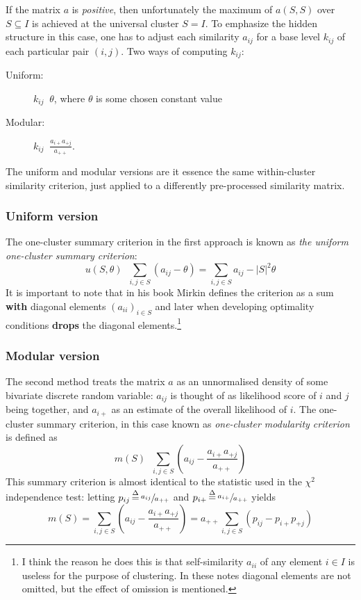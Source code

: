 \documentclass[a4paper]{article}
\newcommand{\brac}[1]{{\left ( #1 \right )}}
\newcommand{\abs}[1]{{\left | #1 \right |}}
\newcommand{\defn}{\mathop{\overset{\Delta}{=}}\nolimits}
\begin{document}
If the matrix $a$ is \emph{positive}, then unfortunately the maximum of $a(S,S)$ over $S\subseteq I$ is achieved at the universal cluster $S=I$. To emphasize the hidden structure in this case, one has to adjust each similarity $a_{ij}$ for a base level $k_{ij}$ of each particular pair $(i,j)$. Two ways of computing $k_{ij}$: \begin{description}
	\item[Uniform:] $k_{ij} \defn \theta$, where $\theta$ is some chosen constant value
	\item[Modular:] $k_{ij} \defn \frac{a_{i+}a_{+j}}{a_{++}}$.
\end{description}
The uniform and modular versions are it essence the same within-cluster similarity criterion, just applied to a differently pre-processed similarity matrix.

\subsubsection*{Uniform version} %
\label{ssub:uniform_version}

The one-cluster summary criterion in the first approach is known as \emph{the uniform one-cluster summary criterion}: \[u(S,\theta) \defn \sum_{i,j\in S} \brac{a_{ij}-\theta} = \sum_{i,j\in S} a_{ij} - \abs{S}^2 \theta\] It is important to note that in his book Mirkin defines the criterion as a sum \textbf{with} diagonal elements $\brac{a_{ii}}_{i\in S}$ and later when developing optimality conditions \textbf{drops} the diagonal elements.\footnote{I think the reason he does this is that self-similarity $a_{ii}$ of any element $i\in I$ is useless for the purpose of clustering. In these notes diagonal elements are not omitted, but the effect of omission is mentioned.}


\subsubsection*{Modular version} %
\label{ssub:modular_version}

The second method treats the matrix $a$ as an unnormalised density of some bivariate discrete random variable: $a_{ij}$ is thought of as likelihood score of $i$ and $j$ being together, and $a_{i+}$ as an estimate of the overall likelihood of $i$. The one-cluster summary criterion, in this case known as \emph{one-cluster modularity criterion} is defined as \[m(S) \defn \sum_{i,j\in S} \brac{a_{ij}-\frac{a_{i+}a_{+j}}{a_{++}}}\] This summary criterion is almost identical to the statistic used in the $\chi^2$ independence test: letting $p_{ij} \defn \sfrac{a_{ij}}{a_{++}}$ and $p_{i+} \defn \sfrac{a_{i+}}{a_{++}}$ yields \[m(S) = \sum_{i,j\in S} \brac{ a_{ij}-\frac{a_{i+}a_{+j}}{a_{++} } } = a_{++} \sum_{i,j\in S} \brac{ p_{ij} - p_{i+}p_{+j}}\]
\end{document}
